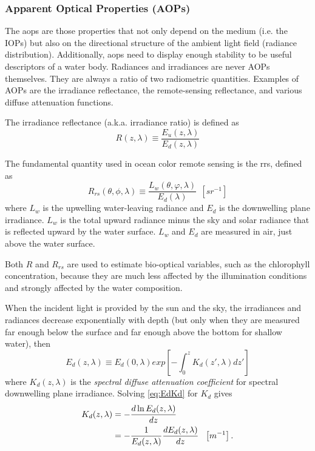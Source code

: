 \subsubsection*{Apparent Optical Properties (AOPs)}
The \gls{aops} are those properties that not only depend on the medium (i.e. the IOPs) but also on the directional structure of the ambient light field (radiance distribution). Additionally, \gls{aops} need to display enough stability to be useful descriptors of a water body. Radiances and irradiances are never AOPs themselves. They are always a ratio of two radiometric quantities. Examples of AOPs are the irradiance reflectance, the remote-sensing reflectance, and various diffuse attenuation functions.

The irradiance reflectance (a.k.a. irradiance ratio) is defined as
\begin{equation}
  R(z,\lambda)\equiv \frac{E_u(z,\lambda)}{E_d(z,\lambda)}
\end{equation}

The fundamental quantity used in ocean color remote sensing is the \acrfull{rrs}, defined as
\begin{equation}
\label{eq:Rrs}
  R_{rs}(\theta,\phi,\lambda)\equiv \frac{L_w(\theta,\varphi,\lambda)}{E_d(\lambda)}~~\left[sr^{-1} \right]
\end{equation}
where $L_w$ is the upwelling water-leaving radiance and $E_d$ is the downwelling plane irradiance. $L_w$ is the total upward radiance minus the sky and solar radiance that is reflected upward by the water surface. $L_w$ and $E_d$ are measured in air, just above the water surface.

Both $R$ and $R_{rs}$ are used to estimate bio-optical variables, such as the chlorophyll concentration, because they are much less affected by the illumination conditions and strongly affected by the water composition.

When the incident light is provided by the sun and the sky, the irradiances and radiances decrease exponentially with depth (but only when they are measured far enough below the surface and far enough above the bottom for shallow water), then
\begin{equation}\label{eq:EdKd}
  E_d(z,\lambda)\equiv E_d(0,\lambda) exp\left[-\int_0^{z}K_d(z',\lambda)dz'\right]
\end{equation}
where $K_d(z,\lambda)$ is the {\it spectral diffuse attenuation coefficient} for spectral downwelling plane irradiance. Solving \autoref{eq:EdKd} for $K_d$ gives
\begin{align}
  K_d(z,\lambda)  &=- \frac{d\ln E_d(z,\lambda)}{dz} \notag \\
          &=-\frac{1}{E_d(z,\lambda)}\frac{dE_d(z,\lambda)}{dz} ~~\left[m^{-1} \right].
\end{align}

